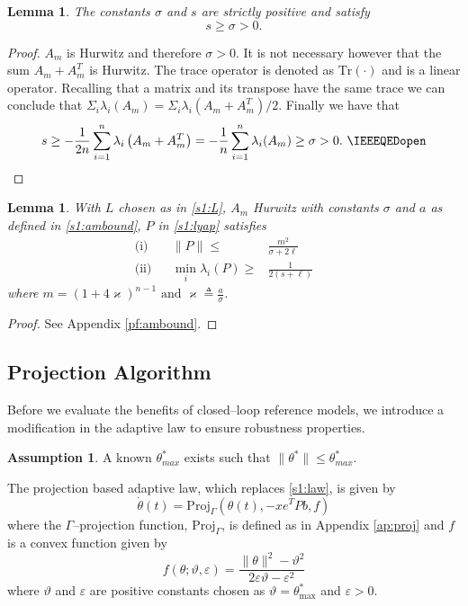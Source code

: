 \documentclass[10pt,journal]{IEEEtran}
\theoremstyle{plain}%
\newtheorem{lem}[thm]{Lemma}
\theoremstyle{definition}
\newtheorem{assm}{Assumption}
\newcommand{\be}[0]{\begin{equation}}
\newcommand{\ee}[0]{\end{equation}}
\newcommand{\ben}[0]{\begin{equation*}}
\newcommand{\een}[0]{\end{equation*}}
\newcommand{\norms}[1]{\lVert#1\rVert}
\newcommand{\normB}[0]{\norms}
\let\norm=\normB
\renewcommand{\IEEEQED}{\IEEEQEDopen}
\begin{document}
\begin{lem}\label{sgs}
The constants $\sigma$ and $s$ are strictly positive and satisfy
\ben
s\geq\sigma>0.
\een
\end{lem}
\begin{proof}
 $A_m$ is Hurwitz and therefore $\sigma>0$. It is not necessary however that the sum $A_m+A_m^T$ is Hurwitz. The trace operator is denoted as $\text{Tr} (\cdot)$ and is a linear operator. Recalling that a matrix and its transpose have the same trace we can conclude that $\Sigma _i \lambda_i(A_m) =\Sigma _i \lambda_i(A_m+A_m^T)/2$. Finally we have that
 \ben
 s \geq -\frac 1 {2n} \sum_{i=1}^n \lambda_i\left(A_m+A_m^T\right) = -\frac 1 n \sum_{i=1}^n \lambda_i(A_m) \geq \sigma>0.  \ \IEEEQED
 \een
 \let\IEEEQED\relax 
\end{proof}


\begin{lem} \label{ambarbound}
With $L$  chosen as in \eqref{s1:L}, $A_m$ Hurwitz with constants $\sigma$ and $a$ as defined in \eqref{s1:ambound}, $P$ in \eqref{s1:lyap} satisfies
\begin{align}\label{s1:pbound}
 \text{(i)} & &\norm P \leq& \frac{m^2}{\sigma + 2\ell}  & &\\ 
 \text{(ii)} & &\min_i \lambda_i{(P)} \geq &\frac{1}{2(s+\ell)}& & \label{minP}
\end{align}
where $m=(1+4\varkappa)^{n-1} \text{ and } \varkappa \triangleq \frac a \sigma$.\end{lem}
\begin{proof} See Appendix \ref{pf:ambound}.\let\IEEEQED\relax\end{proof}

\subsection{Projection Algorithm}
Before we evaluate the benefits of closed--loop reference models, we introduce a modification in the adaptive law to ensure robustness properties. 
\begin{assm}\label{asm:thetas}
A  known $\theta^*_{max}$ exists such that $\norm{\theta^*}\leq \theta^*_{max}$.\end{assm}
The projection based adaptive law, which replaces \eqref{s1:law}, is given by
\be\label{s2:adaplaw}
\dot \theta(t) = \text{Proj}_\Gamma \left(\theta(t),-x e^T P b ,f \right)  
\ee
where the $\Gamma$--projection function, $\text{Proj}_\Gamma$, is defined as in Appendix \ref{ap:proj} and $f$ is a convex function given by
\be\label{eq:f}
f(\theta;\vartheta,\varepsilon) = \frac{\norm \theta^2 -\vartheta^2}{2 \varepsilon \vartheta - \varepsilon^2}
\ee
where $\vartheta$ and $\varepsilon$ are positive constants chosen as $\vartheta = \theta^*_\text{max}$ and $\varepsilon>0$. 
\end{document}
